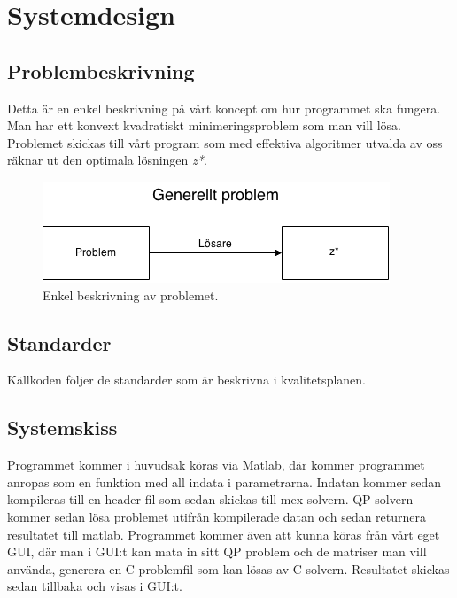 \section{Systemdesign}


\subsection{Problembeskrivning}
Detta är en enkel beskrivning på vårt koncept om hur programmet ska fungera. Man har ett konvext kvadratiskt minimeringsproblem som man vill lösa. Problemet skickas till vårt program som med effektiva algoritmer utvalda av oss räknar ut den optimala lösningen \textit{z*}.

\begin{figure}[h]
	\begin{center}
		\includegraphics[scale=0.5]{bilder/Generellt.png}
	\end{center}
	\caption{Enkel beskrivning av problemet.}
\end{figure}

\subsection{Standarder}
Källkoden följer de standarder som är beskrivna i kvalitetsplanen.

\subsection{Systemskiss}
Programmet kommer i huvudsak köras via Matlab, där kommer programmet anropas som en funktion med all indata i parametrarna. Indatan kommer sedan kompileras till en header fil som sedan skickas till mex solvern. QP-solvern kommer sedan lösa problemet utifrån kompilerade datan och sedan returnera resultatet till matlab. Programmet kommer även att kunna köras från vårt eget GUI, där man i GUI:t kan mata in sitt QP problem och de matriser man vill använda, generera en C-problemfil som kan lösas av C solvern. Resultatet skickas sedan tillbaka och visas i GUI:t.


